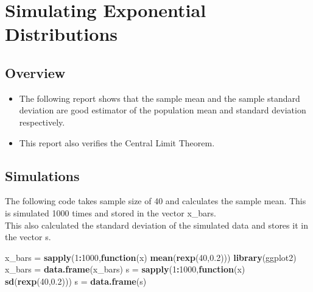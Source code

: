 \documentclass[
]{article}
\author{}
\date{\vspace{-2.5em}}
\newenvironment{Shaded}{\begin{snugshade}}{\end{snugshade}}
\newcommand{\ControlFlowTok}[1]{\textcolor[rgb]{0.13,0.29,0.53}{\textbf{#1}}}
\newcommand{\DecValTok}[1]{\textcolor[rgb]{0.00,0.00,0.81}{#1}}
\newcommand{\FloatTok}[1]{\textcolor[rgb]{0.00,0.00,0.81}{#1}}
\newcommand{\KeywordTok}[1]{\textcolor[rgb]{0.13,0.29,0.53}{\textbf{#1}}}
\newcommand{\NormalTok}[1]{#1}
\newcommand{\OperatorTok}[1]{\textcolor[rgb]{0.81,0.36,0.00}{\textbf{#1}}}
\newcommand{\StringTok}[1]{\textcolor[rgb]{0.31,0.60,0.02}{#1}}
\providecommand{\tightlist}{%
  \setlength{\itemsep}{0pt}\setlength{\parskip}{0pt}}
\begin{document}
\hypertarget{simulating-exponential-distributions}{%
\section{Simulating Exponential
Distributions}\label{simulating-exponential-distributions}}

\hypertarget{overview}{%
\subsection{Overview}\label{overview}}

\begin{itemize}
\tightlist
\item
  The following report shows that the sample mean and the sample
  standard deviation are good estimator of the population mean and
  standard deviation respectively.\\
\item
  This report also verifies the Central Limit Theorem.
\end{itemize}

\hypertarget{simulations}{%
\subsection{Simulations}\label{simulations}}

The following code takes sample size of 40 and calculates the sample
mean. This is simulated 1000 times and stored in the vector x\_bars.\\
This also calculated the standard deviation of the simulated data and
stores it in the vector s.

\begin{Shaded}
\begin{Highlighting}[]
\NormalTok{x_bars =}\StringTok{ }\KeywordTok{sapply}\NormalTok{(}\DecValTok{1}\OperatorTok{:}\DecValTok{1000}\NormalTok{,}\ControlFlowTok{function}\NormalTok{(x) }\KeywordTok{mean}\NormalTok{(}\KeywordTok{rexp}\NormalTok{(}\DecValTok{40}\NormalTok{,}\FloatTok{0.2}\NormalTok{)))}
\KeywordTok{library}\NormalTok{(ggplot2)}
\NormalTok{x_bars =}\StringTok{ }\KeywordTok{data.frame}\NormalTok{(x_bars)}
\NormalTok{s =}\StringTok{ }\KeywordTok{sapply}\NormalTok{(}\DecValTok{1}\OperatorTok{:}\DecValTok{1000}\NormalTok{,}\ControlFlowTok{function}\NormalTok{(x) }\KeywordTok{sd}\NormalTok{(}\KeywordTok{rexp}\NormalTok{(}\DecValTok{40}\NormalTok{,}\FloatTok{0.2}\NormalTok{)))}
\NormalTok{s =}\StringTok{ }\KeywordTok{data.frame}\NormalTok{(s)}
\end{Highlighting}
\end{Shaded}
\end{document}
